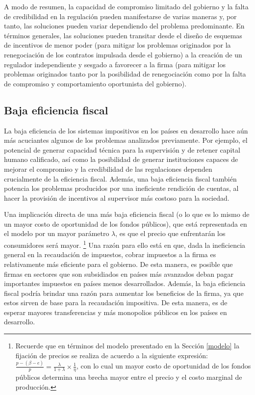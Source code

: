 \documentclass[
  12pt,
  spanish,
]{book}
\begin{document}
A modo de resumen, la capacidad de compromiso limitado del gobierno y la falta de credibilidad en la regulación pueden manifestarse de varias maneras y, por tanto, las soluciones pueden variar dependiendo del problema predominante. En términos generales, las soluciones pueden transitar desde el diseño de esquemas de incentivos de menor poder (para mitigar los problemas originados por la renegociación de los contratos impulsada desde el gobierno) a la creación de un regulador independiente y sesgado a favorecer a la firma (para mitigar los problemas originados tanto por la posibilidad de renegociación como por la falta de compromiso y comportamiento oportunista del gobierno).

\hypertarget{baja-eficiencia-fiscal}{%
\subsection{Baja eficiencia fiscal}\label{baja-eficiencia-fiscal}}

La baja eficiencia de los sistemas impositivos en los países en desarrollo hace aún más acuciantes algunos de los problemas analizados previamente. Por ejemplo, el potencial de generar capacidad técnica para la supervisión y de retener capital humano calificado, así como la posibilidad de generar instituciones capaces de mejorar el compromiso y la credibilidad de las regulaciones dependen crucialmente de la eficiencia fiscal. Además, una baja eficiencia fiscal también potencia los problemas producidos por una ineficiente rendición de cuentas, al hacer la provisión de incentivos al supervisor más costoso para la sociedad.

Una implicación directa de una más baja eficiencia fiscal (o lo que es lo mismo de un mayor costo de oportunidad de los fondos públicos), que está representada en el modelo por un mayor parámetro \(λ\), es que el precio que enfrentarán los consumidores será mayor.
\footnote{Recuerde que en términos del modelo presentado en la Sección \ref{modelo} la fijación de precios se realiza de acuerdo a la siguiente expresión: \(\frac{p-\left(\beta-e\right)}{p}=\frac{\lambda}{1+\lambda}\times\frac{1}{\eta}\), con lo cual un mayor costo de oportunidad de los fondos públicos determina una brecha mayor entre el precio y el costo marginal de producción.}
Una razón para ello está en que, dada la ineficiencia general en la recaudación de impuestos, cobrar impuestos a la firma es relativamente más eficiente para el gobierno. De esta manera, es posible que firmas en sectores que son subsidiados en países más avanzados deban pagar importantes impuestos en países menos desarrollados. Además,
la baja eficiencia fiscal podría brindar una razón para aumentar los beneficios de la firma, ya que estos sirven de base para la recaudación impositiva. De esta manera, es de esperar mayores transferencias y más monopolios públicos en los países en desarrollo.
\end{document}
